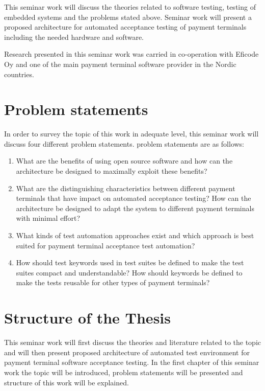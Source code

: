 This seminar work will discuss the theories related to software testing, testing of embedded systems and the problems stated above. Seminar work will present a proposed architecture for automated acceptance testing of payment terminals including the needed hardware and software.

Research presented in this seminar work was carried in co-operation with Eficode Oy and one of the main payment terminal software provider in the Nordic countries.

\section{Problem statements}

In order to survey the topic of this work in adequate level, this seminar work will discuss four different problem statements. problem statements are as follows:
\begin{enumerate}
\item What are the benefits of using open source software and how can the architecture be designed to maximally exploit these benefits?
\item What are the distinguishing characteristics between different payment terminals that have impact on automated acceptance testing? How can the architecture be designed to adapt the system to different payment terminals with minimal effort?
\item What kinds of test automation approaches exist and which approach is best suited for payment terminal acceptance test automation?
\item How should test keywords used in test suites be defined to make
the test suites compact and understandable? How should keywords be defined to make the tests reusable for other types of payment terminals?
\end{enumerate}

\section{Structure of the Thesis}
\label{section:structure} 

This seminar work will first discuss the theories and literature related to the topic and will then present proposed architecture of automated test environment for payment terminal software acceptance testing. In the first chapter of this seminar work the topic will be introduced, problem statements will be presented and structure of this work will be explained.

